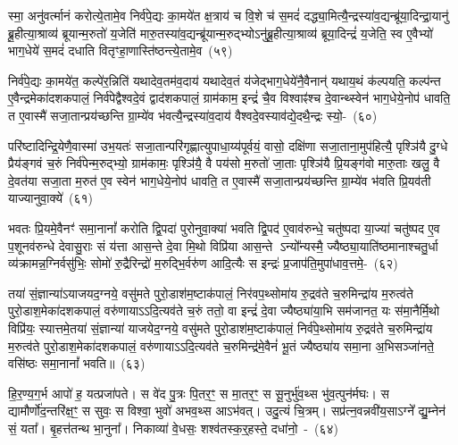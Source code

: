 स्मा॒ अनु॑वर्त्मानं करोत्ये॒तामे॒व निर्व॑पे॒द्यः का॒मये॑त क्ष॒त्राय॑ च वि॒शे च॑ स॒मदं॑ दद्ध्या॒मित्यै॒न्द्रस्या॑व॒द्यन्ब्रू॑या॒दिन्द्रा॒यानु॑ ब्रू॒हीत्या॒श्राव्य॑ ब्रूयान्म॒रुतो॑ य॒जेति॑ मारु॒तस्या॑व॒द्यन्ब्रू॑यान्म॒रुद्भ्यो\-ऽनु॑ब्रू॒हीत्या॒श्राव्य॑ ब्रूया॒दिन्द्रं॑ य॒जेति॒ स्व ए॒वैभ्यो॑ भाग॒धेये॑ स॒मदं॑ दधाति वितृꣳहा॒णास्ति॑ष्ठन्त्ये॒तामे॒व~(५९)\ip

निर्व॑पे॒द्यः का॒मये॑त॒ कल्पे॑र॒न्निति॑ यथादेव॒तम॑व॒दाय॑ यथादेव॒तं य॑जेद्भाग॒धेये॑नै॒वैनान्॑ यथाय॒थं क॑ल्पयति॒ कल्प॑न्त ए॒वैन्द्रमेका॑\-दश\-कपालं॒ निर्व॑पेद्वैश्वदे॒वं द्वाद॑श\-कपालं॒ ग्राम॑काम॒ इन्द्रं॑ चै॒व विश्वाꣴ॑श्च दे॒वान्थ्स्वेन॑ भाग॒धेये॒नोप॑ धावति॒ त ए॒वास्मै॑ सजा॒तान्प्रय॑च्छन्ति ग्रा॒म्ये॑व भ॑वत्यै॒न्द्रस्या॑व॒दाय॑ वैश्वदे॒वस्याव॑द्ये॒दथै॒न्द्रः स्यो॒-~(६०)\ip

परि॑ष्टादिन्द्रि॒येणै॒वास्मा॑ उभ॒यतः॑ सजा॒तान्परि॑\-गृह्णात्युपाधा॒य्य॑\-पूर्वयं॒ वासो॒ दक्षि॑णा सजा॒ताना॒मुप॑हित्यै॒ पृश्ञि॑यै दु॒ग्धे प्रैय॑ङ्गवं च॒रुं निर्व॑पेन्म॒रुद्भ्यो॒ ग्राम॑कामः॒ पृश्ञि॑यै॒ वै पय॑सो म॒रुतो॑ जा॒ताः पृश्ञि॑यै प्रि॒यङ्ग॑वो मारु॒ताः खलु॒ वै दे॒वत॑या सजा॒ता म॒रुत॑ ए॒व स्वेन॑ भाग॒धेये॒नोप॑ धावति॒ त ए॒वास्मै॑ सजा॒तान्प्रय॑च्छन्ति ग्रा॒म्ये॑व भ॑वति प्रि॒यव॑ती याज्यानुवा॒क्ये॑~(६१)\ip

भवतः प्रि॒यमे॒वैनꣳ॑ समा॒नानां᳚ करोति द्वि॒पदा॑ पुरोनुवा॒क्या॑ भवति द्वि॒पद॑ ए॒वाव॑\-रुन्धे॒ चतु॑ष्पदा या॒ज्या॑ चतु॑ष्पद ए॒व प॒शूनव॑\-रुन्धे देवासु॒राः सं य॑त्ता आस॒न्ते दे॒वा मि॒थो विप्रि॑या आस॒न्ते \-ऽन्यो᳚न्यस्मै॒ ज्यैष्ठ्या॒याति॑ष्ठमानाश्चतु॒र्धा व्य॑क्रामन्न॒ग्निर्वसु॑भिः॒ सोमो॑ रु॒द्रैरिन्द्रो॑ म॒रुद्भि॒र्वरु॑ण आदि॒त्यैः स इन्द्रः॑ प्र॒जा\-प॑ति॒मुपा॑धाव॒त्तमे॒-~(६२)\ip

तया॑ सं॒ज्ञान्या॑\-ऽयाजयद॒ग्नये॒ वसु॑मते पुरो॒डाश॑\-म॒ष्टा\-क॑पालं॒ निर॑वप॒थ्सोमा॑य रु॒द्रव॑ते च॒रुमिन्द्रा॑य म॒रुत्व॑ते पुरो॒डाश॒मेका॑\-दश\-कपालं॒ वरु॑णाया\-ऽऽ\-दि॒त्यव॑ते च॒रुं ततो॒ वा इन्द्रं॑ दे॒वा ज्यैष्ठ्या॑या॒भि सम॑जानत॒ यः स॑मा॒नैर्मि॒थो विप्रि॑यः॒ स्यात्तमे॒तया॑ सं॒ज्ञान्या॑ याजयेद॒ग्नये॒ वसु॑मते पुरो॒डाश॑\-म॒ष्टा\-क॑पालं॒ निर्व॑पे॒थ्सोमा॑य रु॒द्रव॑ते च॒रुमिन्द्रा॑य म॒रुत्व॑ते पुरो॒डाश॒मेका॑\-दश\-कपालं॒ वरु॑णाया\-ऽऽ\-दि॒त्यव॑ते च॒रुमिन्द्र॑मे॒वैनं॑ भू॒तं ज्यैष्ठ्या॑य समा॒ना अ॒भिसञ्जा॑नते॒ वसि॑ष्ठः समा॒नानां᳚ भवति॥~(६३)\ip

{\anuvakamend[{विश॑मे॒व ति॑ष्ठन्त्ये॒तामे॒वाथै॒न्द्रस्य॑ याज्यानुवा॒क्ये॑ तं वरु॑णाय॒ चतु॑र्दश च}]}


हि॒र॒ण्य॒ग॒र्भ आपो॑ ह॒ यत्प्रजा॑पते। स वे॑द पु॒त्रः पि॒तर॒ꣳ॒ स मा॒तर॒ꣳ॒ स सू॒नुर्भु॑व॒थ्स भु॑व॒त्पुन॑र्मघः। स द्यामौर्णो॑द॒न्तरि॑क्ष॒ꣳ॒ स सुवः॒ स विश्वा॒ भुवो॑ अभव॒थ्स आ\-ऽभ॑वत्। उदु॒त्यं चि॒त्रम्। सप्र॑त्न॒वन्नवी॑य॒सा\-ऽग्ने᳚ द्यु॒म्नेन॑ सं॒ यता᳚। बृ॒हत्त॑तन्थ भा॒नुना᳚। निकाव्या॑ वे॒धसः॒ शश्व॑तस्क॒र्॒\mbox{}हस्ते॒ दधा॑नो॒~-~(६४)\ip

